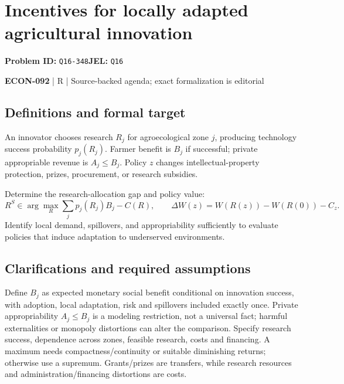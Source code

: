 \documentclass[11pt,a4paper]{article}
\begin{document}
\section*{Incentives for locally adapted agricultural innovation}
\textbf{Problem ID:} \texttt{Q16-348}\quad \textbf{JEL:} \texttt{Q16}\par
\label{problem:OP-0651}


\label{audited:ECON-092}

{\sffamily\small\color{muted}\textbf{ECON-092} | R | Source-backed agenda; exact formalization is editorial\par}

\subsection*{Definitions and formal target}

An innovator chooses research $R_j$ for agroecological zone $j$, producing technology success probability $p_j(R_j)$. Farmer benefit is $B_j$ if successful; private appropriable revenue is $A_j\leq B_j$. Policy $z$ changes intellectual-property protection, prizes, procurement, or research subsidies.

Determine the research-allocation gap and policy value:
\[
 R^S\in\arg\max_R\sum_jp_j(R_j)B_j-C(R),\qquad
 \Delta W(z)=W(R(z))-W(R(0))-C_z.
\]
Identify local demand, spillovers, and appropriability sufficiently to evaluate policies that induce adaptation to underserved environments.

\subsection*{Clarifications and required assumptions}

Define \(B_j\) as expected monetary social benefit conditional on innovation success, with adoption, local adaptation, risk and spillovers included exactly once. Private appropriability \(A_j\leq B_j\) is a modeling restriction, not a universal fact; harmful externalities or monopoly distortions can alter the comparison. Specify research success, dependence across zones, feasible research, costs and financing. A maximum needs compactness/continuity or suitable diminishing returns; otherwise use a supremum. Grants/prizes are transfers, while research resources and administration/financing distortions are costs.
\end{document}
